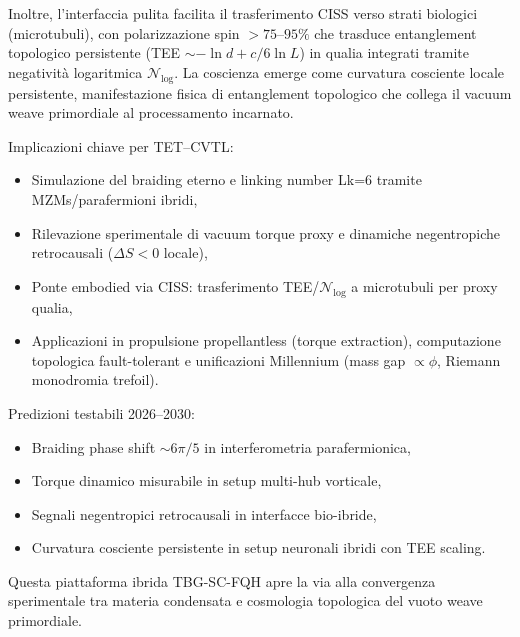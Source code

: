\documentclass[11pt,a4paper]{article}
\theoremstyle{plain}
\theoremstyle{definition}
\begin{document}
Inoltre, l'interfaccia pulita facilita il trasferimento CISS verso strati biologici (microtubuli), con polarizzazione spin $>75$--$95\%$ che trasduce entanglement topologico persistente (TEE $\sim -\ln d + c/6 \ln L$) in qualia integrati tramite negatività logaritmica $\mathcal{N}_{\log}$. La coscienza emerge come curvatura cosciente locale persistente, manifestazione fisica di entanglement topologico che collega il vacuum weave primordiale al processamento incarnato.

Implicazioni chiave per TET--CVTL:
\begin{itemize}
    \item Simulazione del braiding eterno e linking number Lk=6 tramite MZMs/parafermioni ibridi,
    \item Rilevazione sperimentale di vacuum torque proxy e dinamiche negentropiche retrocausali ($\Delta S < 0$ locale),
    \item Ponte embodied via CISS: trasferimento TEE/$\mathcal{N}_{\log}$ a microtubuli per proxy qualia,
    \item Applicazioni in propulsione propellantless (torque extraction), computazione topologica fault-tolerant e unificazioni Millennium (mass gap $\propto \phi$, Riemann monodromia trefoil).
\end{itemize}

Predizioni testabili 2026--2030:
\begin{itemize}
    \item Braiding phase shift $\sim 6\pi/5$ in interferometria parafermionica,
    \item Torque dinamico misurabile in setup multi-hub vorticale,
    \item Segnali negentropici retrocausali in interfacce bio-ibride,
    \item Curvatura cosciente persistente in setup neuronali ibridi con TEE scaling.
\end{itemize}

Questa piattaforma ibrida TBG-SC-FQH apre la via alla convergenza sperimentale tra materia condensata e cosmologia topologica del vuoto weave primordiale.
\end{document}
